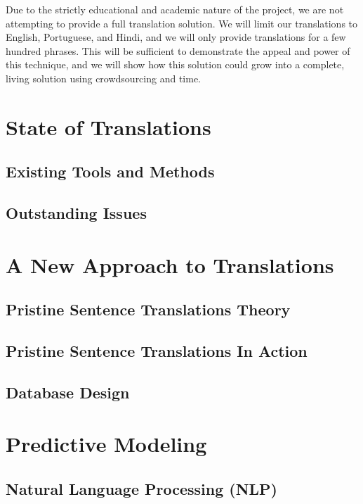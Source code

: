 \documentclass{llncs}
\begin{document}
Due to the strictly educational and academic nature of the project, we are not attempting to provide a full translation solution. We will limit our translations to English, Portuguese, and Hindi, and we will only provide translations for a few hundred phrases. This will be sufficient to demonstrate the appeal and power of this technique, and we will show how this solution could grow into a complete, living solution using crowdsourcing and time. 

\section{State of Translations}

\subsection{Existing Tools and Methods}

\subsection{Outstanding Issues}

\section{A New Approach to Translations}

\subsection{Pristine Sentence Translations Theory}

\subsection{Pristine Sentence Translations In Action}

\subsection{Database Design}

\section{Predictive Modeling}

\subsection{Natural Language Processing (NLP)}
\end{document}
